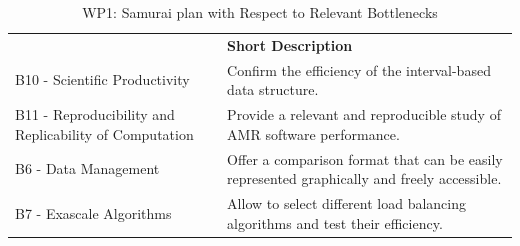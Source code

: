 \begin{table}[h!]
    \centering


    \centering
    {
        \setlength{\parindent}{0pt}
        \def\arraystretch{1.25}
        {
            \fontsize{9}{11}\selectfont
            \begin{tabular}{!{\color{numpexgray}\vrule}p{.25\linewidth}!{\color{numpexgray}\vrule}p{.6885\linewidth}!{\color{numpexgray}\vrule}}

     &  {\rule{0pt}{2.5ex}\color{white}\bf Short Description }\\

    B10 - Scientific Productivity & Confirm the efficiency of the interval-based data structure. \\
    B11 - Reproducibility and Replicability of Computation & Provide a relevant and reproducible study of AMR software performance. \\
    B6 - Data Management & Offer a comparison format that can be easily represented graphically and freely accessible. \\
    B7 - Exascale Algorithms & Allow to select different load balancing algorithms and test their efficiency.  \\
\end{tabular}
        }
    }
    \caption{WP1: Samurai plan with Respect to Relevant Bottlenecks}
    \label{tab:WP1:Samurai:bottlenecks}
\end{table}